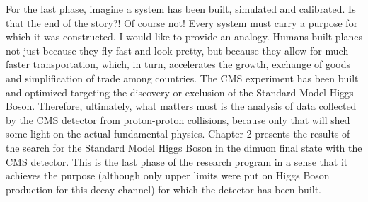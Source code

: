 For the last phase, imagine a system has been built, simulated and calibrated. Is that the end of the story?! Of course not! Every system must carry a purpose for which it was constructed. I would like to provide an analogy. Humans built planes not just because they fly fast and look pretty, but because they allow for much faster transportation, which, in turn, accelerates the growth, exchange of goods and simplification of trade among countries. The CMS experiment has been built and optimized targeting the discovery or exclusion of the Standard Model Higgs Boson. Therefore, ultimately, what matters most is the analysis of data collected by the CMS detector from proton-proton collisions, because only that will shed some light on the actual fundamental physics. Chapter 2 presents the results of the search for the Standard Model Higgs Boson in the dimuon final state with the CMS detector. This is the last phase of the research program in a sense that it achieves the purpose (although only upper limits were put on Higgs Boson production for this decay channel) for which the detector has been built.





